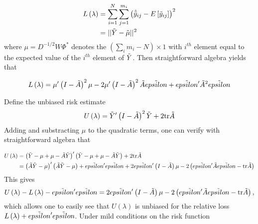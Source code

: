 \begin{align}
\begin{split}
L\left(\lambda\right) &= \sum_{i = 1}^N \sum_{j = 1}^{m_i} \left(\hat{\tilde{y}}_{ij} - E\left[\tilde{y}_{ij}\right] \right)^2\\
&= \vert \vert \tilde{Y} - \tilde{\mu} \vert \vert^2
\end{split}
\end{align}
\noindent
where $\mu = D^{-1/2}W \Phi^*$ denotes the $\left( \sum \limits_{i} m_i - N\right) \times 1$ with $i^{th}$ element equal to the expected value of the  $i^{th}$ element of $\tilde{Y}$.  Then straightforward algebra yields that 

\begin{align} 
L\left(\lambda\right) = \mu'\left( I - \tilde{A} \right)^2\mu - 2\mu'\left( I - \tilde{A} \right)^2 \tilde{A} \tilde{epsilon} + \tilde{epsilon}' \tilde{A}^2 \tilde{epsilon}
\end{align}

Define the unbiased risk estimate
\begin{equation} 
U\left(\lambda\right) = \tilde{Y}'\left( I - \tilde{A} \right)^2\tilde{Y} + 2\mbox{tr}\tilde{A}
\end{equation}
 \noindent
Adding and substracting $\mu$ to the quadratic terms, one can verify with straightforward algebra that

\begin{align}
\begin{split}
U\left(\lambda\right) &= \left( \tilde{Y} - \mu + \mu - \tilde{A} \tilde{Y} \right)'\left( \tilde{Y} - \mu + \mu - \tilde{A} \tilde{Y} \right) + 2\mbox{tr}\tilde{A} \\
&= \left(\tilde{A} \tilde{Y} - \mu \right)'\left( \tilde{A} \tilde{Y} - \mu \right) + \tilde{epsilon}'\tilde{epsilon} + 2\tilde{epsilon}' \left( I- \tilde{A}\right)\mu- 2\left( \tilde{epsilon}'\tilde{A} \tilde{epsilon} -  \mbox{tr}\tilde{A}\right)
\end{split}
\end{align}
\noindent
This gives
\begin{equation} 
U\left(\lambda\right) - L\left(\lambda\right) - \tilde{epsilon}'\tilde{epsilon}  =  2\tilde{epsilon}' \left( I- \tilde{A}\right)\mu- 2\left( \tilde{epsilon}'\tilde{A} \tilde{epsilon} -  \mbox{tr}\tilde{A}\right), 
\end{equation}
 \noindent
 which allows one to easily see that $U\left(\lambda\right)$ is unbiased for the relative loss $L\left(\lambda\right) + \tilde{epsilon}'\tilde{epsilon}$.  Under mild conditions on the risk function
 
